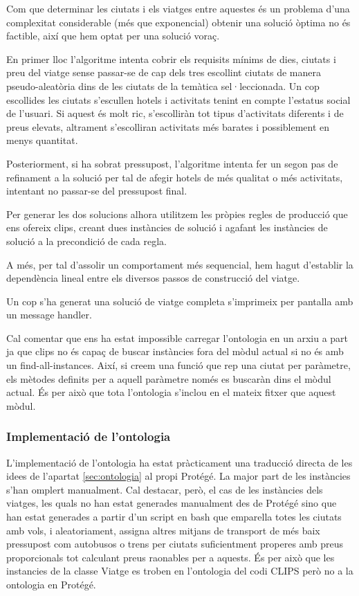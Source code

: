 \documentclass[11pt,a4paper]{article}
\begin{document}
Com que determinar les ciutats i els viatges entre aquestes és un problema d'una complexitat considerable (més que exponencial) obtenir una solució òptima no és factible, així que hem optat per una solució voraç.

En primer lloc l'algoritme intenta cobrir els requisits mínims de dies, ciutats i preu del viatge sense passar-se de cap dels tres escollint ciutats de manera pseudo-aleatòria dins de les ciutats de la temàtica sel·leccionada. Un cop escollides les ciutats s'escullen hotels i activitats tenint en compte l'estatus social de l'usuari. Si aquest és molt ric, s'escolliràn tot tipus d'activitats diferents i de preus elevats, altrament s'escolliran activitats més barates i possiblement en menys quantitat.

Posteriorment, si ha sobrat pressupost, l'algoritme intenta fer un segon pas de refinament a la solució per tal de afegir hotels de més qualitat o més activitats, intentant no passar-se del pressupost final.

Per generar les dos solucions alhora utilitzem les pròpies regles de producció que ens ofereix clips, creant dues instàncies de solució i agafant les instàncies de solució a la precondició de cada regla.

A més, per tal d'assolir un comportament més sequencial, hem hagut d'establir la dependència lineal entre els diversos passos de construcció del viatge. 

Un cop s'ha generat una solució de viatge completa s'imprimeix per pantalla amb un message handler.

Cal comentar que ens ha estat impossible carregar l'ontologia en un arxiu a part ja que clips no és capaç de buscar instàncies fora del mòdul actual si no és amb un find-all-instances. Així, si creem una funció que rep una ciutat per paràmetre, els mètodes definits per a aquell paràmetre només es buscaràn dins el mòdul actual. És per això que tota l'ontologia s'inclou en el mateix fitxer que aquest mòdul.




\subsubsection{Implementació de l'ontologia}
L'implementació de l'ontologia ha estat pràcticament una traducció directa de les idees de l'apartat \ref{sec:ontologia} al propi Protégé. La major part de les instàncies s'han omplert manualment. Cal destacar, però, el cas de les instàncies dels viatges, les quals no han estat generades manualment des de Protégé sino que han estat generades a partir d'un script en bash que emparella totes les ciutats amb vols, i aleatoriament, assigna altres mitjans de transport de més baix pressupost com autobusos o trens per ciutats suficientment properes amb preus proporcionals tot calculant preus raonables per a aquests. És per això que les instancies de la classe Viatge es troben en l'ontologia del codi CLIPS però no a la ontologia en Protégé.
\end{document}
